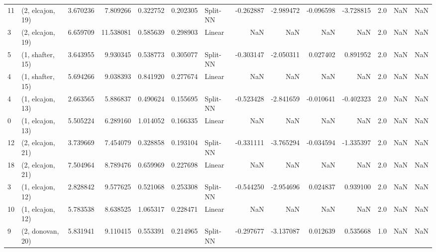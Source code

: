 \begin{tabular}{llrrrrlrrrrrrl}
11 &  (2, elcajon, 19) &   3.670236 &   7.809266 &   0.322752 &  0.202305 &    Split-NN &       -0.262887 &     -2.989472 &      -0.096598 &    -3.728815 &            2.0 &    NaN &              NaN \\
3  &  (2, elcajon, 19) &   6.659709 &  11.538081 &   0.585639 &  0.298903 &      Linear &             NaN &           NaN &            NaN &          NaN &            2.0 &    NaN &              NaN \\
5  &  (1, shafter, 15) &   3.643955 &   9.930345 &   0.538773 &  0.305077 &    Split-NN &       -0.303147 &     -2.050311 &       0.027402 &     0.891952 &            2.0 &    NaN &              NaN \\
4  &  (1, shafter, 15) &   5.694266 &   9.038393 &   0.841920 &  0.277674 &      Linear &             NaN &           NaN &            NaN &          NaN &            2.0 &    NaN &              NaN \\
4  &  (1, elcajon, 13) &   2.663565 &   5.886837 &   0.490624 &  0.155695 &    Split-NN &       -0.523428 &     -2.841659 &      -0.010641 &    -0.402323 &            2.0 &    NaN &              NaN \\
0  &  (1, elcajon, 13) &   5.505224 &   6.289160 &   1.014052 &  0.166335 &      Linear &             NaN &           NaN &            NaN &          NaN &            2.0 &    NaN &              NaN \\
12 &  (2, elcajon, 21) &   3.739669 &   7.454079 &   0.328858 &  0.193104 &    Split-NN &       -0.331111 &     -3.765294 &      -0.034594 &    -1.335397 &            2.0 &    NaN &              NaN \\
18 &  (2, elcajon, 21) &   7.504964 &   8.789476 &   0.659969 &  0.227698 &      Linear &             NaN &           NaN &            NaN &          NaN &            2.0 &    NaN &              NaN \\
3  &  (1, elcajon, 12) &   2.828842 &   9.577625 &   0.521068 &  0.253308 &    Split-NN &       -0.544250 &     -2.954696 &       0.024837 &     0.939100 &            2.0 &    NaN &              NaN \\
10 &  (1, elcajon, 12) &   5.783538 &   8.638525 &   1.065317 &  0.228471 &      Linear &             NaN &           NaN &            NaN &          NaN &            2.0 &    NaN &              NaN \\
9  &  (2, donovan, 20) &   5.831941 &   9.110415 &   0.553391 &  0.214965 &    Split-NN &       -0.297677 &     -3.137087 &       0.012639 &     0.535668 &            1.0 &    NaN &              NaN \\

\end{tabular}
